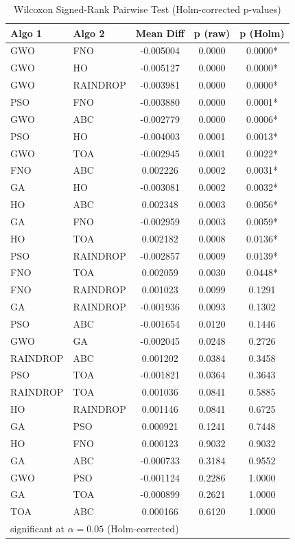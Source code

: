 \begin{table}[htbp]
\centering
\caption{Wilcoxon Signed-Rank Pairwise Test (Holm-corrected p-values)}
\label{tab:wilcoxon}
\begin{tabular}{llccc}
\hline
\textbf{Algo 1} & \textbf{Algo 2} & \textbf{Mean Diff} & \textbf{p (raw)} & \textbf{p (Holm)} \\
\hline
GWO & FNO & -0.005004 & 0.0000 & 0.0000* \\
GWO & HO & -0.005127 & 0.0000 & 0.0000* \\
GWO & RAINDROP & -0.003981 & 0.0000 & 0.0000* \\
PSO & FNO & -0.003880 & 0.0000 & 0.0001* \\
GWO & ABC & -0.002779 & 0.0000 & 0.0006* \\
PSO & HO & -0.004003 & 0.0001 & 0.0013* \\
GWO & TOA & -0.002945 & 0.0001 & 0.0022* \\
FNO & ABC & 0.002226 & 0.0002 & 0.0031* \\
GA & HO & -0.003081 & 0.0002 & 0.0032* \\
HO & ABC & 0.002348 & 0.0003 & 0.0056* \\
GA & FNO & -0.002959 & 0.0003 & 0.0059* \\
HO & TOA & 0.002182 & 0.0008 & 0.0136* \\
PSO & RAINDROP & -0.002857 & 0.0009 & 0.0139* \\
FNO & TOA & 0.002059 & 0.0030 & 0.0448* \\
FNO & RAINDROP & 0.001023 & 0.0099 & 0.1291 \\
GA & RAINDROP & -0.001936 & 0.0093 & 0.1302 \\
PSO & ABC & -0.001654 & 0.0120 & 0.1446 \\
GWO & GA & -0.002045 & 0.0248 & 0.2726 \\
RAINDROP & ABC & 0.001202 & 0.0384 & 0.3458 \\
PSO & TOA & -0.001821 & 0.0364 & 0.3643 \\
RAINDROP & TOA & 0.001036 & 0.0841 & 0.5885 \\
HO & RAINDROP & 0.001146 & 0.0841 & 0.6725 \\
GA & PSO & 0.000921 & 0.1241 & 0.7448 \\
HO & FNO & 0.000123 & 0.9032 & 0.9032 \\
GA & ABC & -0.000733 & 0.3184 & 0.9552 \\
GWO & PSO & -0.001124 & 0.2286 & 1.0000 \\
GA & TOA & -0.000899 & 0.2621 & 1.0000 \\
TOA & ABC & 0.000166 & 0.6120 & 1.0000 \\
\hline
\multicolumn{5}{l}{\small * significant at $\alpha=0.05$ (Holm-corrected)} \\
\end{tabular}
\end{table}
